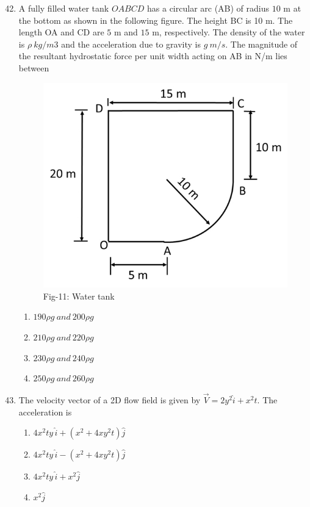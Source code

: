 \documentclass[journal]{IEEEtran}
\theoremstyle{remark}
\begin{document}
\newpage
\vspace*{0.25cm}

\begin{enumerate}[itemsep=1em]
\setcounter{enumi}{41}
\item A fully filled water tank $OABCD$ has a circular arc (AB) of radius $10$ m at the bottom as shown in the following figure. The height BC is 10 m. The length OA and CD are $5$ m and $15$ m, respectively. The density of the water is $\rho \ kg/m3$ and 
the acceleration due to gravity is $g \ m/s$. The magnitude of the resultant hydrostatic force per unit width acting on AB in N/m lies between 
\begin{figure}[H]
    \centering
    \includegraphics[width=0.6\columnwidth]{figs/fig-11.jpeg}
    \caption*{Fig-11: Water tank}
    \label{fig-11}
\end{figure}

\begin{enumerate}[leftmargin=2.5em, labelsep=0.5em, itemsep=0.5em]
     \item $190\rho g \ and \ 200\rho g$
     \item $210\rho g \ and \ 220\rho g$
     \item $230\rho g \ and \ 240\rho g$
     \item $250\rho g \ and \ 260\rho g$
\end{enumerate}


\end{enumerate}

\begin{enumerate}[itemsep=1em]
\setcounter{enumi}{42}
\item The velocity vector of a 2D flow field is given by $\vec{V} = 2y^2 \hat{i} + x^2 t$. The acceleration is  
\begin{enumerate}[leftmargin=2.5em, labelsep=0.5em, itemsep=0.5em]
     \item $4x^2ty \, \hat{i} + (x^2 + 4xy^2t) \hat{j}$
     \item $4x^2ty \, \hat{i} - (x^2 + 4xy^2t) \hat{j}$
     \item $4x^2ty \, \hat{i} + x^2 \hat{j}$
     \item $x^2 \hat{j}$

\end{enumerate}
   
\end{enumerate}
\end{document}
